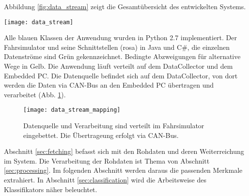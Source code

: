 \label{chap:implementation}

Abbildung \ref{fig:data_stream} zeigt die Gesamtübersicht des entwickelten Systems. 
\begin{figure*} 
  \begin{center}
    \texttt{[image: data\_stream]}
    \caption[Aufbau der Anwendung]{Der Aufbau des entwickelten System zur Müdigkeitserkennung. Grün: Datenströme, Blau: Python Klassen der Anwendung, Gelb: bedingte Abzweigungen, Rosa: Klassen der Fahrsimulatorumgebung\label{fig:data_stream}}
  \end{center}
\end{figure*}
Alle blauen Klassen der Anwendung wurden in Python 2.7 implementiert. Der Fahrsimulator und seine Schnittstellen (rosa) in Java und C\#, die einzelnen Datenströme sind Grün gekennzeichnet. Bedingte Abzweigungen für alternative Wege in Gelb. Die Anwendung läuft verteilt auf dem DataCollector und dem Embedded PC. Die Datenquelle befindet sich auf dem DataCollector, von dort werden die Daten via CAN-Bus an den Embedded PC übertragen und verarbeitet (Abb. \ref{fig:data_stream_mapping}). 
\begin{figure}[h] 
  \begin{center}
    \texttt{[image: data\_stream\_mapping]}
    \caption[Einbettung der Anwendung]{Datenquelle und Verarbeitung sind verteilt im Fahrsimulator eingebettet. Die Übertrageung erfolgt via CAN-Bus. \label{fig:data_stream_mapping}}
  \end{center}
\end{figure}

\threadingSequence

Abschnitt \ref{sec:fetching} befasst sich mit den Rohdaten und deren Weiterreichung im System. Die Verarbeitung der Rohdaten ist Thema von Abschnitt \ref{sec:processing}. Im folgenden Abschnitt werden daraus die passenden Merkmale extrahiert. In Abschnitt \ref{sec:classification} wird die Arbeitsweise des Klassifikators näher beleuchtet. 


